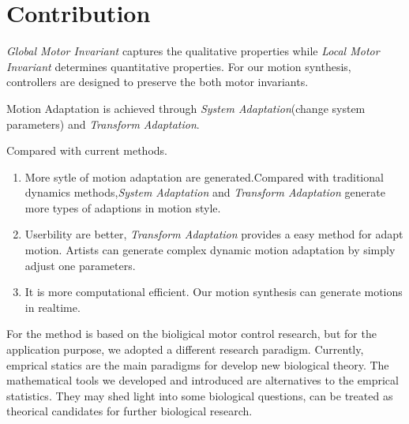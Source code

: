 \section{Contribution}
\emph{Global Motor Invariant} captures the qualitative properties while \emph{Local Motor Invariant} determines quantitative properties. 
For our motion synthesis, controllers are designed to preserve the both motor invariants. 

Motion Adaptation is achieved through \emph{System Adaptation}(change system parameters) and \emph{Transform Adaptation}.

Compared with current \cms methods.
\begin{enumerate}
\item More sytle of motion adaptation are generated.Compared with traditional dynamics \cms methods,\emph{System Adaptation} and \emph{Transform Adaptation} generate more types of adaptions in motion style.
\item Userbility are better, \emph{Transform Adaptation} provides a easy method for adapt motion. Artists can generate complex dynamic motion adaptation by simply adjust one parameters.
\item It is more computational efficient. Our motion synthesis can generate motions in realtime.
\end{enumerate}

For the method is based on the bioligical motor control research, but for the application purpose, we adopted a different research paradigm.
Currently, emprical statics are the main paradigms for develop new biological theory.
The mathematical tools we developed and introduced are alternatives to the emprical statistics.
They may shed light into some biological questions, can be treated as theorical candidates for further biological research.

